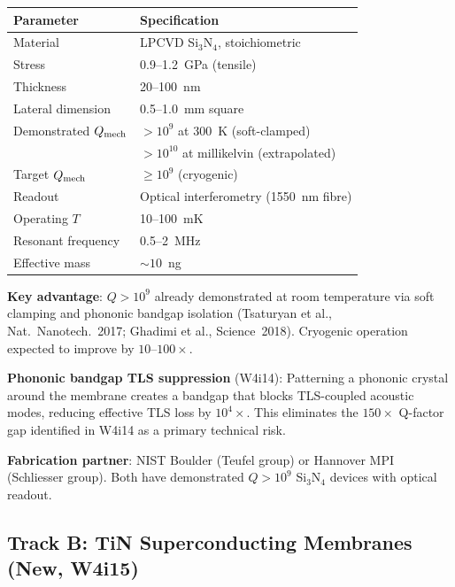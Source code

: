 \documentclass[11pt]{article}
\newcommand{\Qmech}{Q_{\rm mech}}
\begin{document}
\begin{center}
\renewcommand{\arraystretch}{1.2}
\begin{tabular}{@{}ll@{}}
\toprule
\textbf{Parameter} & \textbf{Specification} \\
\midrule
Material & LPCVD Si$_3$N$_4$, stoichiometric \\
Stress & 0.9--1.2~GPa (tensile) \\
Thickness & 20--100~nm \\
Lateral dimension & 0.5--1.0~mm square \\
Demonstrated $\Qmech$ & $> 10^9$ at 300~K (soft-clamped) \\
& $> 10^{10}$ at millikelvin (extrapolated) \\
Target $\Qmech$ & $\geq 10^9$ (cryogenic) \\
Readout & Optical interferometry (1550~nm fibre) \\
Operating $T$ & 10--100~mK \\
Resonant frequency & 0.5--2~MHz \\
Effective mass & $\sim 10$~ng \\
\bottomrule
\end{tabular}
\end{center}

\textbf{Key advantage}: $Q > 10^9$ already demonstrated at room
temperature via soft clamping and phononic bandgap isolation
(Tsaturyan et al., Nat.~Nanotech.~2017; Ghadimi et al.,
Science~2018). Cryogenic operation expected to improve by $10$--$100\times$.

\textbf{Phononic bandgap TLS suppression} (W4i14): Patterning a
phononic crystal around the membrane creates a bandgap that blocks
TLS-coupled acoustic modes, reducing effective TLS loss by $10^4\times$.
This eliminates the $150\times$ Q-factor gap identified in W4i14 as a
primary technical risk.

\textbf{Fabrication partner}: NIST Boulder (Teufel group) or Hannover
MPI (Schliesser group). Both have demonstrated $Q > 10^9$ Si$_3$N$_4$
devices with optical readout.

\subsection{Track B: TiN Superconducting Membranes (New, W4i15)}
\end{document}
